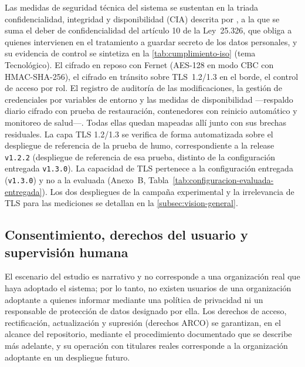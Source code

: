 Las medidas de seguridad técnica del sistema se sustentan en la triada confidencialidad, integridad y disponibilidad (CIA) descrita por \textcite{Stallings2018_computer_security}, a la que se suma el deber de confidencialidad del artículo 10 de la Ley~25.326, que obliga a quienes intervienen en el tratamiento a guardar secreto de los datos personales, y su evidencia de control se sintetiza en la \autoref{tab:cumplimiento-iso} (tema Tecnológico). El cifrado en reposo con Fernet (AES-128 en modo CBC con HMAC-SHA-256), el cifrado en tránsito sobre TLS~1.2/1.3 en el borde, el control de acceso por rol. El registro de auditoría de las modificaciones, la gestión de credenciales por variables de entorno y las medidas de disponibilidad ---respaldo diario cifrado con prueba de restauración, contenedores con reinicio automático y monitoreo de salud---. Todas ellas quedan mapeadas allí junto con sus brechas residuales. La capa TLS 1.2/1.3 se verifica de forma automatizada sobre el despliegue de referencia de la prueba de humo, correspondiente a la release \texttt{v1.2.2} (despliegue de referencia de esa prueba, distinto de la configuración entregada \texttt{v1.3.0}). La capacidad de TLS pertenece a la configuración entregada (\texttt{v1.3.0}) y no a la evaluada (Anexo~B, Tabla~\ref{tab:configuracion-evaluada-entregada}). Los dos despliegues de la campaña experimental y la irrelevancia de TLS para las mediciones se detallan en la \autoref{subsec:vision-general}.

\subsection{Consentimiento, derechos del usuario y supervisión humana}\label{subsec:consentimiento-derechos}

El escenario del estudio es narrativo y no corresponde a una organización real que haya adoptado el sistema; por lo tanto, no existen usuarios de una organización adoptante a quienes informar mediante una política de privacidad ni un responsable de protección de datos designado por ella. Los derechos de acceso, rectificación, actualización y supresión (derechos ARCO) se garantizan, en el alcance del repositorio, mediante el procedimiento documentado que se describe más adelante, y su operación con titulares reales corresponde a la organización adoptante en un despliegue futuro.

